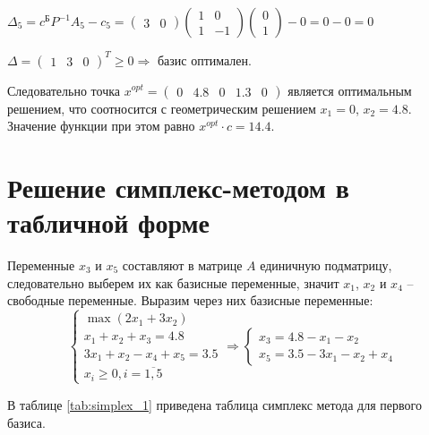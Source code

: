 \begin{enumerate}[leftmargin=*]
$\Delta_5 = c^\text{Б} P^{-1} A_5 - c_5 =
\begin{pmatrix}
	3 & 0
\end{pmatrix}
\begin{pmatrix}
	1 & 0 \\
	1 & -1
\end{pmatrix}
\begin{pmatrix}
	0 \\
	1
\end{pmatrix} - 0 = 0 - 0 = 0$

$\Delta = \begin{pmatrix} 1 & 3 & 0 \end{pmatrix}^T \geq 0 \Rightarrow$ базис оптимален. 

Следовательно точка $x^{opt} = \begin{pmatrix} 0 & 4.8 & 0 & 1.3 & 0 \end{pmatrix}$ является оптимальным решением, что соотносится с геометрическим решением $x_1 = 0$, $x_2 = 4.8$. Значение функции при этом равно $x^{opt} \cdot c = 14.4$.

\end{enumerate}

\newpage

\section{Решение симплекс-методом в табличной форме}

Переменные $x_3$ и $x_5$ составляют в матрице $A$ единичную подматрицу, следовательно выберем их как базисные переменные, значит $x_1$, $x_2$ и $x_4$ -- свободные переменные. Выразим через них базисные переменные:
\begin{equation*}
\begin{cases}
	\max \left( 2 x_1 + 3 x_2 \right) \\
	x_1 + x_2 + x_3 = 4.8 \\
	3 x_1 + x_2 - x_4 + x_5 = 3.5 \\
	x_i \ge 0, i = \overline{1,5}
\end{cases}
\Rightarrow
\begin{cases}
	x_3 = 4.8 - x_1 - x_2 \\
	x_5 = 3.5 - 3x_1 - x_2 + x_4
\end{cases}
\end{equation*}

В таблице \ref{tab:simplex_1} приведена таблица симплекс метода для первого базиса.

